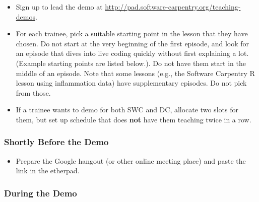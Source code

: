 \begin{itemize}
\itemsep1pt\parskip0pt
\item
  Sign up to lead the demo at
  \url{http://pad.software-carpentry.org/teaching-demos}.
\item
  For each trainee, pick a suitable starting point in the lesson that
  they have chosen. Do not start at the very beginning of the first
  episode, and look for an episode that dives into live coding quickly
  without first explaining a lot. (Example starting points are listed
  below.). Do not have them start in the middle of an episode. Note that
  some lessons (e.g., the Software Carpentry R lesson using inflammation
  data) have supplementary episodes. Do not pick from those.
\item
  If a trainee wants to demo for both SWC and DC, allocate two slots for
  them, but set up schedule that does \textbf{not} have them teaching
  twice in a row.
\end{itemize}

\subsubsection{Shortly Before the Demo}\label{shortly-before-the-demo}

\begin{itemize}
\itemsep1pt\parskip0pt
\item
  Prepare the Google hangout (or other online meeting place) and paste
  the link in the etherpad.
\end{itemize}

\subsubsection{During the Demo}\label{during-the-demo}

